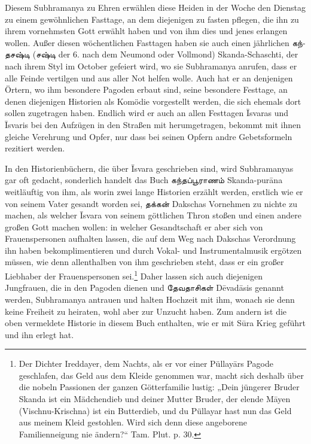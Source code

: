 \documentclass{article}
\newcommand{\TamilText}[1]{\texttamil{#1}}
\newcommand{\tam}[1]{\TamilText{#1}}
\begin{document}
Diesem Subhramanya zu Ehren erwählen diese Heiden in der Woche den Dienstag zu einem gewöhnlichen Fasttage, an dem diejenigen zu fasten pflegen, die ihn zu ihrem vornehmsten Gott erwählt haben und von ihm dies und jenes erlangen wollen. Außer diesen wöchentlichen Fasttagen haben sie auch einen jährlichen \tam{கந்தசஷ்டி} (\tam{சஷ்டி} der 6. nach dem Neumond oder Vollmond) Skanda-Schaschti, der nach ihrem Styl im October gefeiert wird, wo sie Subhramanya anrufen, dass er alle Feinde vertilgen und aus aller Not helfen wolle. Auch hat er an denjenigen Örtern, wo ihm besondere Pagoden erbaut sind, seine besondere Festtage, an denen diejenigen Historien als Komödie vorgestellt werden, die sich ehemals dort sollen zugetragen haben. Endlich wird er auch an allen Festtagen \={I}svaras und \={I}svaris bei den Aufzügen in den Straßen mit herumgetragen, bekommt mit ihnen gleiche Verehrung und Opfer, nur dass bei seinen Opfern andre Gebetsformeln rezitiert werden.

In den Historienbüchern, die über \={I}svara geschrieben sind, wird Subhramanyas gar oft gedacht, sonderlich handelt das Buch \tam{கந்தப்பூராணம்} Skanda-pur\={a}na weitläuftig von ihm, als worin zwei lange Historien erzählt werden, erstlich wie er von seinem Vater gesandt worden sei, \tam{தக்கன்} Dakschas Vornehmen zu nichte zu machen, als welcher \={I}svara von seinem göttlichen Thron stoßen und einen andere großen Gott machen wollen: in welcher Gesandtschaft er aber sich von Frauenspersonen aufhalten lassen, die auf dem Weg nach Dakschas Verordnung ihn haben bekomplimentieren und durch Vokal- und Instrumentalmusik ergötzen müssen, wie denn allenthalben von ihm geschrieben steht, dass er ein großer Liebhaber der Frauenspersonen sei.\footnote{Der Dichter Ireddayer, dem Nachts, als er vor einer Püllay\={a}rs Pagode geschlafen, das Geld aus dem Kleide genommen war, macht sich deshalb über die nobeln Passionen der ganzen Götterfamilie lustig: „Dein jüngerer Bruder Skanda ist ein Mädchendieb und deiner Mutter Bruder, der elende M\={a}yen (Vischnu-Krischna) ist ein Butterdieb, und du Püllayar hast nun das Geld aus meinem Kleid gestohlen. Wird sich denn diese angeborene Familienneigung nie ändern?“ Tam. Plut. p. 30.} Daher lassen sich auch diejenigen Jungfrauen, die in den Pagoden dienen und \tam{தேவதாசிகள்} D\={e}vad\={a}sis genannt werden, Subhramanya antrauen und halten Hochzeit mit ihm, wonach sie denn keine Freiheit zu heiraten, wohl aber zur Unzucht haben. Zum andern ist die oben vermeldete Historie in diesem Buch enthalten, wie er mit S\={u}ra Krieg geführt und ihn erlegt hat.
\end{document}
